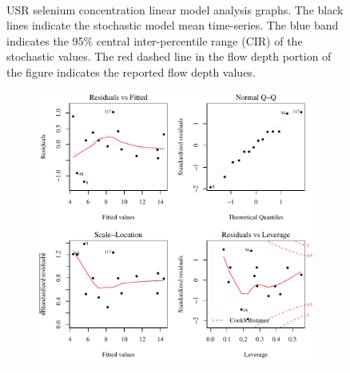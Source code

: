 \begin{landscape}
\begin{figure}
\begin{subfigure}{0.7\textwidth}
		\end{subfigure}\\
		\caption[USR selenium concentration linear model analysis graphs.]{USR selenium concentration linear model analysis graphs. The black lines indicate the stochastic model mean time-series.  The blue band indicates the 95\% central inter-percentile range (CIR) of the stochastic values.  The red dashed line in the flow depth portion of the figure indicates the reported flow depth values.}
		\label{fig:concLmFit_US}
	\end{figure}
\end{landscape}

\subfiguremid
\begin{landscape}
	\begin{figure}
		\begin{subfigure}{0.7\textwidth}
			\centering
			\includegraphics[width=\tableCustomSize]{"Figures/Results_USR/Stochastic/Conc Model lm-fit U167"}
		\end{subfigure}%
		\begin{subfigure}{0.7\textwidth}
			\centering

\end{subfigure}
\end{figure}
\end{landscape}
